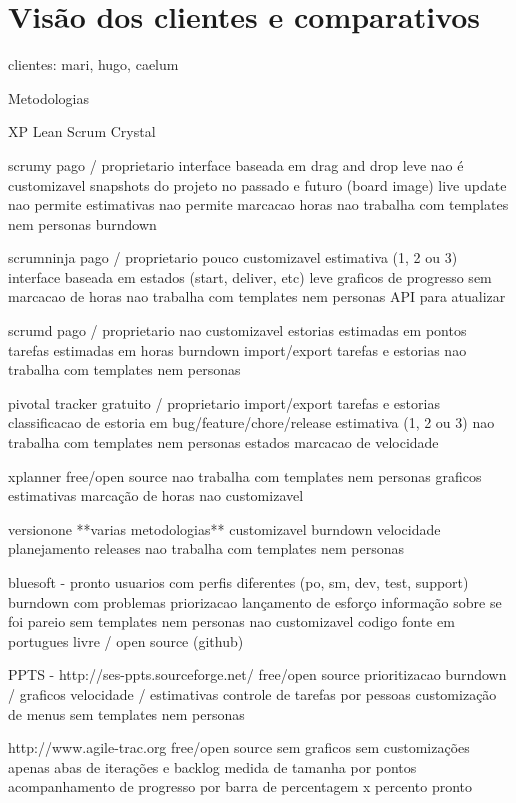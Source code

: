 \section{Visão dos clientes e comparativos}

clientes: mari, hugo, caelum

Metodologias

XP
Lean
Scrum
Crystal


scrumy
	pago / proprietario
	interface baseada em drag and drop
	leve
	nao é customizavel
	snapshots do projeto no passado e futuro (board image)
	live update
	nao permite estimativas
	nao permite marcacao horas
	nao trabalha com templates nem personas
	burndown
	
scrumninja
	pago / proprietario
	pouco customizavel
	estimativa (1, 2 ou 3)
	interface baseada em estados (start, deliver, etc)
	leve
	graficos de progresso
	sem marcacao de horas
	nao trabalha com templates nem personas
	API para atualizar 

scrumd
  pago / proprietario
  nao customizavel
  estorias estimadas em pontos
  tarefas estimadas em horas
  burndown
	import/export tarefas e estorias
	nao trabalha com templates nem personas

pivotal tracker
	gratuito / proprietario
	import/export tarefas e estorias
	classificacao de estoria em bug/feature/chore/release
	estimativa (1, 2 ou 3)
	nao trabalha com templates nem personas
	estados
	marcacao de velocidade
	
xplanner
	free/open source
	nao trabalha com templates nem personas
	graficos
	estimativas
	marcação de horas
	nao customizavel
	
versionone
	**varias metodologias**
	customizavel
	burndown
	velocidade
	planejamento releases
	nao trabalha com templates nem personas

bluesoft - pronto
	usuarios com perfis diferentes (po, sm, dev, test, support)
	burndown com problemas
	priorizacao
	lançamento de esforço
	informação sobre se foi pareio
	sem templates nem personas
	nao customizavel
	codigo fonte em portugues
	livre / open source (github)

PPTS - http://ses-ppts.sourceforge.net/
	free/open source
	prioritizacao
	burndown / graficos
	velocidade / estimativas
	controle de tarefas por pessoas
	customização de menus
	sem templates nem personas

http://www.agile-trac.org
	free/open source
	sem graficos
	sem customizações
	apenas abas de iterações e backlog
	medida de tamanha por pontos
	acompanhamento de progresso por barra de percentagem x percento pronto
	


